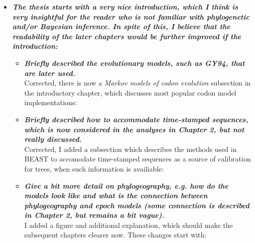 \documentclass[english]{article}
\begin{document}
\begin{itemize}

\item {
{\it
\textbf{
The thesis starts with a very nice introduction, which I think is very insightful for the reader who is not familiar with phylogenetic and/or Bayesian inference. 
In spite of this, I believe that the readability of the later chapters would be further improved if the introduction:
}%
}%
}%

\begin{itemize}

\item {
{\it
\textbf{
Briefly described the evolutionary models, such as GY94, that are later used.
}%
}%
}%
\\
Corrected, there is now a \emph{Markov models of codon evolution} subsection in the introductory chapter, which discusses most popular codon model implementations:

\begin{quote}
\myeditsvonea
\end{quote}

\item {
{\it
\textbf{
Briefly described how to accommodate time-stamped sequences, which is now considered in the analyses in Chapter 2, but not really discussed.
}%
}%
}%
\\
%
%
Corrected, I added a subsection which describes the methods used in BEAST to accomodate time-stamped sequences as a source of calibration for trees, when such information is availiable:

\begin{quote}
\myeditsvoneb
\end{quote}

\item {
{\it
\textbf{
Give a bit more detail on phylogeography, e.g. how do the models look like and what is the connection between phylogeography and epoch models (some connection is described in Chapter 2, but remains a bit vague).
}%
}%
}%
\\
I added a figure and additional explanation, which should make the subsequent chapters clearer now. 
These changes start with:


\end{itemize}
\end{itemize}
\end{document}
